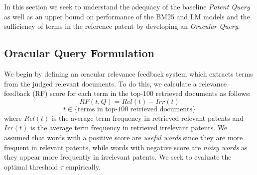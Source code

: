 %

In this section we seek to understand the adequacy of the baseline
\emph{Patent Query} as well as an upper bound on performance of the
BM25 and LM models and the sufficiency of terms in the reference patent 
by developing an \emph{Oracular Query}.

\subsection{Oracular Query Formulation}

We begin by defining an oracular relevance feedback system which
extracts terms from the judged relevant documents.  To do this, we
calculate a relevance feedback (RF) score for each term in the top-100
retrieved documents as follows:
\begin{equation}
RF(t,Q)=Rel(t)-Irr(t) 
 \label{eq:score}
\end{equation}\vspace*{-5ex}
\begin{displaymath}t\in \lbrace \mbox{terms in top-100 retrieved documents}\rbrace\end{displaymath}
where $ Rel(t) $ is the average term frequency in retrieved relevant patents and $ Irr(t) $ is the average term frequency in retrieved irrelevant patents. We assumed that words with a positive score are {\em useful words} since they are more frequent in relevant patents, while words with negative score are {\em noisy words} as they appear more frequently in irrelevant patents.  We seek to evaluate the optimal threshold $\tau$ empirically.

%

